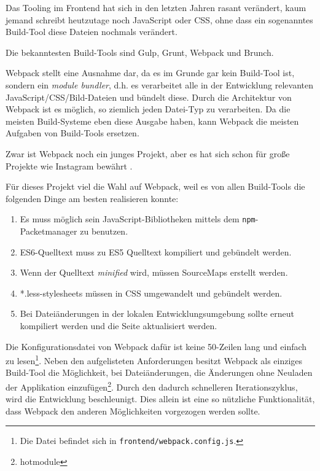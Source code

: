 \documentclass[12pt,twoside]{book}
\begin{document}
Das Tooling im Frontend hat sich in den letzten Jahren rasant verändert, kaum jemand schreibt heutzutage noch JavaScript oder CSS, ohne dass ein sogenanntes Build-Tool diese Dateien nochmals verändert.

Die bekanntesten Build-Tools sind Gulp\cite{gulp}, Grunt\cite{grunt}, Webpack\cite{webpack} und Brunch\cite{brunch}.

Webpack stellt eine Ausnahme dar, da es im Grunde gar kein Build-Tool ist, sondern ein \textit{module bundler}, d.h. es verarbeitet alle in der Entwicklung relevanten JavaScript/CSS/Bild-Dateien und bündelt diese. Durch die Architektur von Webpack ist es möglich, so ziemlich jeden Datei-Typ zu verarbeiten.
Da die meisten Build-Systeme eben diese Ausgabe haben, kann Webpack die meisten Aufgaben von Build-Tools ersetzen.

Zwar ist Webpack noch ein junges Projekt, aber es hat sich schon für große Projekte wie Instagram bewährt \cite{petehuntwebpack}.

Für dieses Projekt viel die Wahl auf Webpack, weil es von allen Build-Tools die folgenden Dinge am besten realisieren konnte:

\begin{enumerate}
	\item Es muss möglich sein JavaScript-Bibliotheken mittels dem \texttt{npm}-Packetmanager zu benutzen.
	\item ES6-Quelltext muss zu ES5 Quelltext kompiliert und gebündelt werden.
	\item Wenn der Quelltext \textit{minified} wird, müssen SourceMaps erstellt werden.
	\item *.less-stylesheets müssen in CSS umgewandelt und gebündelt werden.
	\item Bei Dateiänderungen in der lokalen Entwicklungsumgebung sollte erneut kompiliert werden und die Seite aktualisiert werden.
\end{enumerate}

Die Konfigurationsdatei von Webpack dafür ist keine 50-Zeilen lang und einfach zu lesen\footnote{Die Datei befindet sich in \texttt{frontend/webpack.config.js}.}. Neben den aufgelisteten Anforderungen besitzt Webpack als einziges Build-Tool die Möglichkeit, bei Dateiänderungen, die Änderungen ohne Neuladen der Applikation einzufügen\footnote{hotmodule}. Durch den dadurch schnelleren Iterationszyklus, wird die Entwicklung beschleunigt. Dies allein ist eine so nützliche Funktionalität, dass Webpack  den anderen Möglichkeiten vorgezogen werden sollte.
\end{document}
